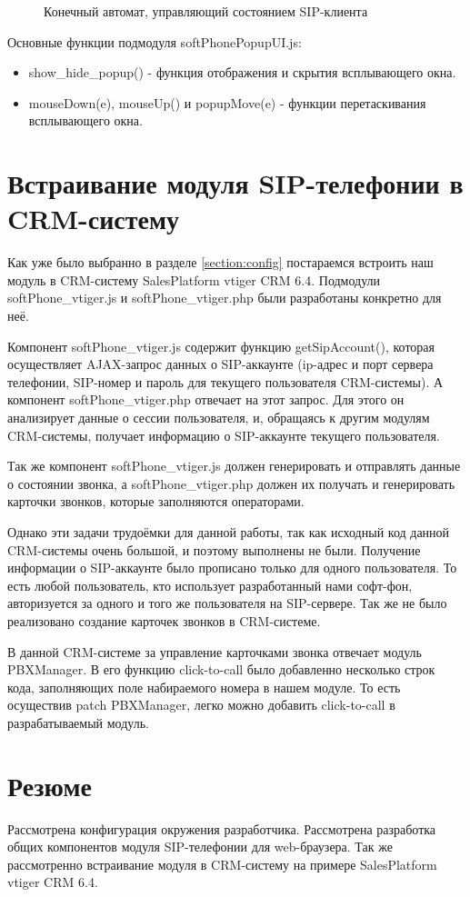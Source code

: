 \begin{figure}[h!]
\caption{Конечный автомат, управляющий состоянием SIP-клиента}
\label{image:FinalState}
\end{figure}

Основные функции подмодуля softPhonePopupUI.js:
\begin{itemize}
\item show\_hide\_popup() - функция отображения и скрытия всплывающего окна.
\item mouseDown(e), mouseUp() и popupMove(e) - функции перетаскивания всплывающего окна.
\end{itemize}

\section{Встраивание модуля SIP-телефонии в CRM-систему}

Как уже было выбранно в разделе \ref{section:config} постараемся встроить наш модуль в CRM-систему SalesPlatform vtiger CRM 6.4. Подмодули softPhone\_vtiger.js и softPhone\_vtiger.php были разработаны конкретно для неё.

Компонент softPhone\_vtiger.js содержит функцию getSipAccount(), которая осуществляет AJAX-запрос данных о SIP-аккаунте (ip-адрес и порт сервера телефонии, SIP-номер и пароль для текущего пользователя CRM-системы). А компонент softPhone\_vtiger.php отвечает на этот запрос. Для этого он анализирует данные о сессии пользователя, и, обращаясь к другим модулям CRM-системы, получает информацию о SIP-аккаунте текущего пользователя.

Так же компонент softPhone\_vtiger.js должен генерировать и отправлять данные о состоянии звонка, а softPhone\_vtiger.php должен их получать и генерировать карточки звонков, которые заполняются операторами.

Однако эти задачи трудоёмки для данной работы, так как исходный код данной CRM-системы очень большой, и поэтому выполнены не были. Получение информации о SIP-аккаунте было прописано только для одного пользователя. То есть любой пользователь, кто использует разработанный нами софт-фон, авторизуется за одного и того же пользователя на SIP-сервере. Так же не было реализовано создание карточек звонков в CRM-системе.

В данной CRM-системе за управление карточками звонка отвечает модуль PBXManager. В его функцию click-to-call было добавленно несколько строк кода, заполняющих поле набираемого номера в нашем модуле. То есть осуществив patch PBXManager, легко можно добавить click-to-call в разрабатываемый модуль.

\section{Резюме}

Рассмотрена конфигурация окружения разработчика. Рассмотрена разработка общих компонентов модуля SIP-телефонии для web-браузера. Так же рассмотренно встраивание модуля в CRM-систему на примере SalesPlatform vtiger CRM 6.4.
